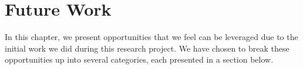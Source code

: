 \chapter{Future Work}\label{chap:Future_Work}
In this chapter, we present opportunities that we feel can be leveraged due to the initial work we did during this research project.
We have chosen to break these opportunities up into several categories, each presented in a section below.


